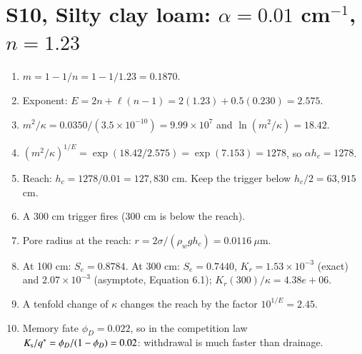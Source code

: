 \section{S10, Silty clay loam: $\alpha=0.01$ cm$^{-1}$, $n=1.23$}
\begin{enumerate}[leftmargin=*,itemsep=1pt]
\item $m=1-1/n=1-1/1.23=0.1870$.
\item Exponent: $E=2n+\ell(n-1)=2(1.23)+0.5(0.230)=2.575$.
\item $m^2/\kappa=0.0350/(3.5\times10^{-10})=9.99\times10^{7}$ and $\ln(m^2/\kappa)=18.42$.
\item $(m^2/\kappa)^{1/E}=\exp(18.42/2.575)=\exp(7.153)=1278$, so $\alpha h_c=1278$.
\item Reach: $h_c=1278/0.01=127,830$ cm. Keep the trigger below $h_c/2=63,915$ cm.
\item A 300 cm trigger fires (300 cm is below the reach).
\item Pore radius at the reach: $r=2\sigma/(\rho_wgh_c)=0.0116\ \mu$m.
\item At 100 cm: $S_e=0.8784$. At 300 cm: $S_e=0.7440$, $K_r=1.53\times10^{-3}$ (exact) and $2.07\times10^{-3}$ (asymptote, Equation 6.1); $K_r(300)/\kappa=4.38e+06$.
\item A tenfold change of $\kappa$ changes the reach by the factor $10^{1/E}=2.45$.
\item Memory fate $\phi_D=0.022$, so in the competition law $K_{\mathrm s}/q^*=\phi_D/(1-\phi_D)=0.02$: withdrawal is much faster than drainage.
\end{enumerate}
